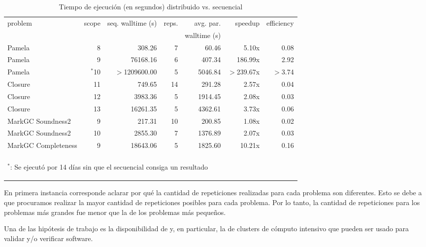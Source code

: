 \begin{table}
	\footnotesize
	\begin{tabular}{lrrrrrr}
		\toprule
		problem	&	scope	&	seq. walltime (s)	&	reps. & avg. par.	&	speedup	&	efficiency \\
			&		&	&	 & walltime (s)	&		&	 \\
		\cmidrule(r){1-7}
		Pamela	&	8	&	308.26	&		7 & 60.46	& 5.10x	&	0.08 \\
		Pamela	&	9	&	76168.16	&	6& 407.34	& 	186.99x	&	2.92 \\
		Pamela	&	$^*$10	&	$>$1209600.00	&	5 & 5046.84	&	$>$239.67x	&	$>$3.74 \\
		\cmidrule(r){1-7}
		Closure	&	11	&	749.65	&	14 & 291.28	&	2.57x	&	0.04 \\
		Closure	&	12	&	3983.36	&	5 & 1914.45	&	2.08x	&	0.03 \\
		Closure	&	13	&	16261.35	& 5 &	4362.61	&	3.73x	&	0.06 \\
		\cmidrule(r){1-7}
		MarkGC Soundness2	&	9	&	217.31	&	10 & 200.85	&	1.08x	&	0.02 \\
		MarkGC Soundness2	&	10	&	 2855.30	&	7 &1376.89	&	2.07x	&	0.03 \\
		\cmidrule(r){1-7}
		MarkGC Completeness	&	9	&	18643.06	&	5 & 1825.60	&	10.21x	&	0.16 \\
		\bottomrule
		\\
		\multicolumn{7}{l}{\begin{tiny}$^*$: Se ejecutó por 14 días sin que el \ssolver secuencial consiga un resultado\end{tiny}}
	\end{tabular}
	\caption{Tiempo de ejecución (en segundos) distribuido vs. secuencial}
	\label{tab:resultados}
\end{table}

En primera instancia corresponde aclarar por qué la cantidad de repeticiones
realizadas para cada problema son diferentes. Esto se debe a que procuramos
realizar la mayor cantidad de repeticiones posibles para cada problema. Por lo
tanto, la cantidad de repeticiones para los problemas más grandes fue menor
que la de los problemas más pequeños.

Una de las hipótesis de trabajo es la disponibilidad de \hard y, en particular, la de clusters de cómputo intensivo que pueden ser usado para validar y/o verificar software. 

